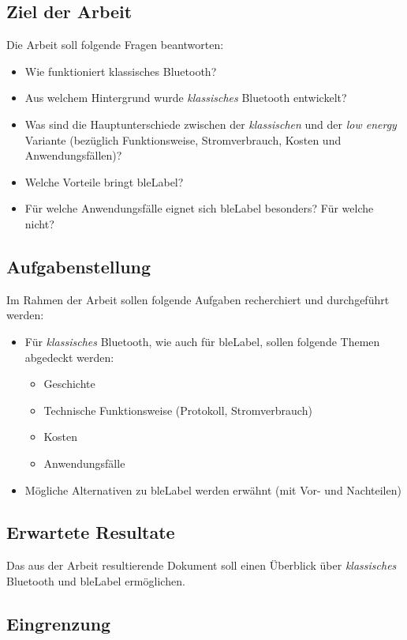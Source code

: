 \subsection{Ziel der Arbeit}
Die Arbeit soll folgende Fragen beantworten:
\begin{itemize}
	\item Wie funktioniert klassisches Bluetooth?
	\item Aus welchem Hintergrund wurde \textit{klassisches} Bluetooth entwickelt?
	\item Was sind die Hauptunterschiede zwischen der \textit{klassischen} und der \textit{low energy} Variante (bezüglich Funktionsweise, Stromverbrauch, Kosten und Anwendungsfällen)?
	\item Welche Vorteile bringt \gls{bleLabel}?
	\item Für welche Anwendungsfälle eignet sich \gls{bleLabel} besonders? Für welche nicht?
\end{itemize}

\subsection{Aufgabenstellung}
Im Rahmen der Arbeit sollen folgende Aufgaben recherchiert und durchgeführt werden:
\begin{itemize}
	\item Für \textit{klassisches} Bluetooth, wie auch für \gls{bleLabel}, sollen folgende Themen abgedeckt werden:
	\begin{itemize}
		\item Geschichte
		\item Technische Funktionsweise (Protokoll, Stromverbrauch)
		\item Kosten
		\item Anwendungsfälle
	\end{itemize}
	\item Mögliche Alternativen zu \gls{bleLabel} werden erwähnt (mit Vor- und Nachteilen)
\end{itemize}

\subsection{Erwartete Resultate}
Das aus der Arbeit resultierende Dokument soll einen Überblick über \textit{klassisches} Bluetooth und \gls{bleLabel} ermöglichen.

\subsection{Eingrenzung}

